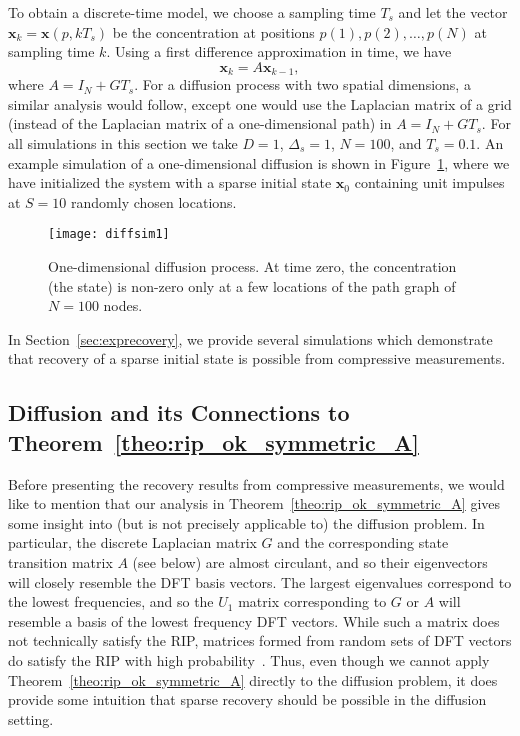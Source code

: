 \documentclass[11pt,draftcls,onecolumn]{IEEEtran}
\def\ss{\vspace*{-3mm}}
\newcommand{\vc}[1]{\boldsymbol{#1}}
\begin{document}
To obtain a discrete-time model, we choose a sampling time $T_{s}$ and let the vector
$\vc{x}_{k}=\vc{x}(p,kT_{s})$ be the concentration at positions $p(1), p(2), \dots, p(N)$ at sampling time $k$.  Using a first difference approximation in time, we have
\[
\vc{x}_{k} = A \vc{x}_{k-1},
\label{eqn:disctime}
\]
where $A = I_N+ G T_{s}$.
For a diffusion process with two spatial dimensions, a similar analysis would follow, except one would use the Laplacian matrix of a grid (instead of the Laplacian matrix of a one-dimensional path) in $A = I_N+ G T_{s}$.
For all simulations in this section we take $D=1$, $\Delta_{s}=1$, $N = 100$, and $T_{s} = 0.1$. An example simulation of a one-dimensional diffusion is shown in Figure~\ref{fig:diffsim1}, where we have initialized the system with a sparse initial state $\vc{x}_0$ containing unit impulses at $S = 10$ randomly chosen locations.

\begin{figure}
\begin{center}
\texttt{[image: diffsim1]}
\caption{One-dimensional diffusion process. At time zero, the concentration (the state) is non-zero only at a few locations of the path graph of $N=100$ nodes.}
\label{fig:diffsim1}
\ss
\end{center}
\end{figure}

In Section~\ref{sec:exprecovery}, we provide several simulations which demonstrate that recovery of a sparse initial state is possible from compressive measurements.

\subsection{Diffusion and its Connections to Theorem~\ref{theo:rip_ok_symmetric_A}}

Before presenting the recovery results from compressive measurements, we would like to mention that our analysis in Theorem~\ref{theo:rip_ok_symmetric_A} gives some insight into (but is not precisely applicable to) the diffusion problem. In particular, the discrete Laplacian matrix $G$ and the corresponding state transition matrix $A$ (see below) are almost circulant, and so their eigenvectors will closely resemble the \ac{DFT} basis vectors. The largest eigenvalues correspond to the lowest frequencies, and so the $U_1$ matrix corresponding to $G$ or $A$ will resemble a basis of the lowest frequency \ac{DFT} vectors. While such a matrix does not technically satisfy the \ac{RIP}, matrices formed from random sets of \ac{DFT} vectors do satisfy the \ac{RIP} with high probability~\cite{rudelson2008sparse}. Thus, even though we cannot apply Theorem~\ref{theo:rip_ok_symmetric_A} directly to the diffusion problem, it does provide some intuition that sparse recovery should be possible in the diffusion setting.
\end{document}
